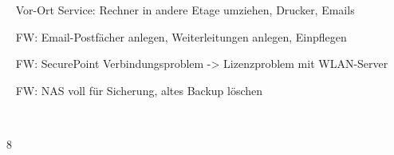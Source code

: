 {{	\textbullet~ Vor-Ort Service: Rechner in andere Etage umziehen, Drucker, Emails\par
	\textbullet~ FW: Email-Postfächer anlegen, Weiterleitungen anlegen, Einpflegen\par
	\textbullet~ FW: SecurePoint Verbindungsproblem -> Lizenzproblem mit WLAN-Server\par
	\textbullet~ FW: NAS voll für Sicherung, altes Backup löschen\par
	\textbullet~ 
	}{}{8}
}{}
\Unterschrift
\newpage
